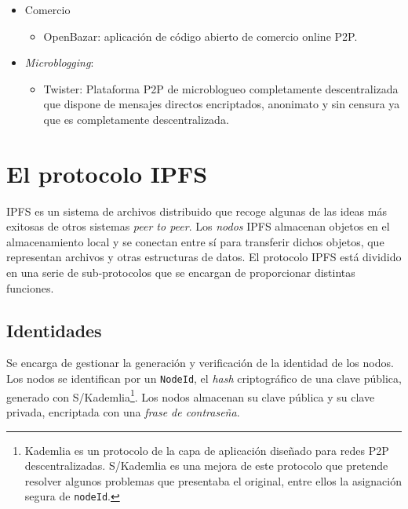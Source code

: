 \documentclass[12pt]{article} %
\begin{document}
\begin{itemize}
\begin{itemize}
    \end{itemize}
   \item Comercio
    \begin{itemize}      
      \item  OpenBazar: aplicación de código abierto de comercio online P2P.
    \end{itemize}
   	\item \textit{Microblogging}:
   	\begin{itemize}
    	\item Twister: Plataforma P2P de microblogueo completamente descentralizada que dispone de mensajes directos encriptados, anonimato y sin censura ya que es completamente descentralizada.
    \end{itemize} 
\end{itemize}



\section{El protocolo IPFS} %
\label{sec:el_protocolo_ipfs}

IPFS\cite{ipfs-white-paper} es un sistema de archivos distribuido que recoge algunas de las ideas más exitosas de otros sistemas \textit{peer to peer}. Los \textit{nodos} IPFS almacenan objetos en el almacenamiento local y se conectan entre sí para transferir dichos objetos, que representan archivos y otras estructuras de datos. El protocolo IPFS está dividido en una serie de sub-protocolos que se encargan de proporcionar distintas funciones.

\subsection{Identidades} %
\label{sub:identidades}

Se encarga de gestionar la generación y verificación de la identidad de los nodos. Los nodos se identifican por un \texttt{NodeId}, el \textit{hash} criptográfico de una clave pública, generado con S/Kademlia\footnote{Kademlia es un protocolo de la capa de aplicación diseñado para redes P2P descentralizadas. S/Kademlia es una mejora de este protocolo que pretende resolver algunos problemas que presentaba el original, entre ellos la asignación segura de \texttt{nodeId}.\cite{S/Kamdelia}}. Los nodos almacenan su clave pública y su clave privada, encriptada con una \textit{frase de contraseña}.
\end{document}
